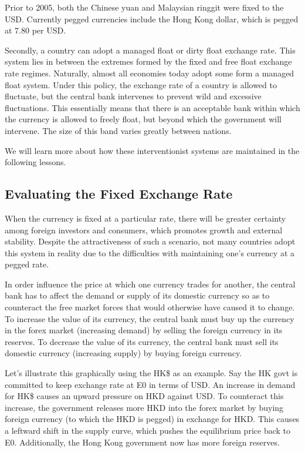 Prior to 2005, both the Chinese yuan and Malaysian ringgit were fixed to the USD. Currently pegged currencies include the Hong Kong dollar, which is pegged at 7.80 per USD.

Secondly, a country can adopt a managed float or dirty float exchange rate. This system lies in between the extremes formed by the fixed and free float exchange rate regimes. Naturally, almost all economies today adopt some form a managed float system. Under this policy, the exchange rate of a country is allowed to fluctuate, but the central bank intervenes to prevent wild and excessive fluctuations. This essentially means that there is an acceptable bank within which the currency is allowed to freely float, but beyond which the government will intervene. The size of this band varies greatly between nations.

We will learn more about how these interventionist systems are maintained in the following lessons.
\subsection{Evaluating the Fixed Exchange Rate}
When the currency is fixed at a particular rate, there will be greater certainty among foreign investors and consumers, which promotes growth and external stability. Despite the attractiveness of such a scenario, not many countries adopt this system in reality due to the difficulties with maintaining one's currency at a pegged rate.

In order influence the price at which one currency trades for another, the central bank has to affect the demand or supply of its domestic currency so as to counteract the free market forces that would otherwise have caused it to change. To increase the value of its currency, the central bank must buy up the currency in the forex market (increasing demand) by selling the foreign currency in its reserves. To decrease the value of its currency, the central bank must sell its domestic currency (increasing supply) by buying foreign currency.

 Let's illustrate this graphically using the HK\$ as an example. Say the HK govt is committed to keep exchange rate at E0 in terms of USD. An increase in demand for HK\$ causes an upward pressure on HKD against USD. To counteract this increase, the government releases more HKD into the forex market by buying foreign currency (to which the HKD is pegged) in exchange for HKD. This causes a leftward shift in the supply curve, which pushes the equilibrium price back to E0. Additionally, the Hong Kong government now has more foreign reserves.

